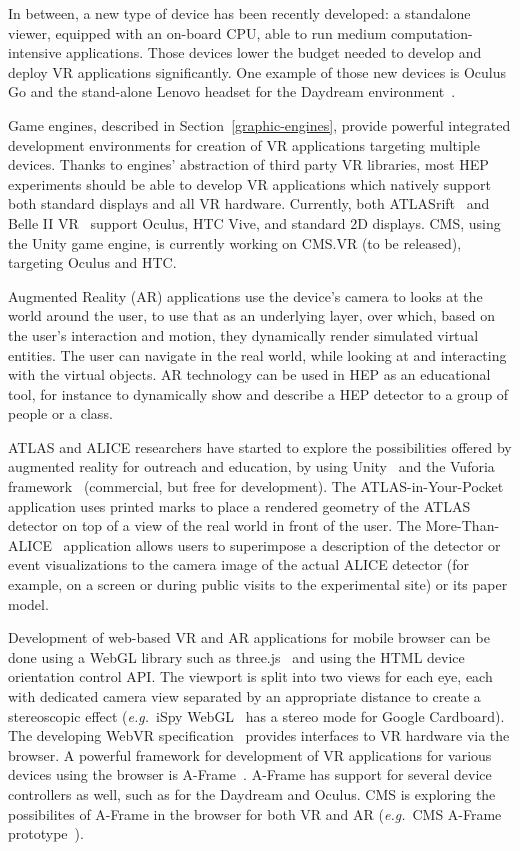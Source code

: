 \documentclass[12pt,a4paper]{article}
\begin{document}
In between, a new type of device has been recently developed: a standalone viewer, equipped with an on-board CPU, able to run
medium computation-intensive applications. Those devices lower the budget needed to develop and deploy VR applications significantly.
One example of those new devices is Oculus Go\cite{OculusGo} and the stand-alone Lenovo headset for the
Daydream environment~\cite{LenovoMirageSolo}.

Game engines, described in Section~\ref{graphic-engines},  provide powerful integrated development environments for
creation of VR applications targeting multiple devices. Thanks to engines' abstraction of third party VR libraries,
most HEP experiments should be able to develop VR applications which natively support both standard displays and all VR hardware.
Currently, both ATLASrift~\cite{ATLASRift} and Belle II VR~\cite{BelleIIVR} support Oculus, HTC Vive,
and standard 2D displays. CMS, using the Unity game engine, is currently working on CMS.VR (to be released), targeting Oculus and HTC.

Augmented Reality (AR) applications use the device's camera to looks at the world around the user, to use that as an underlying layer,
over which, based on the user's interaction and motion, they dynamically render simulated virtual entities. The user can navigate in the real world, while
looking at and interacting with the virtual objects. AR technology can be used in HEP as an educational tool, for instance to
dynamically show and describe a HEP detector to a group of people or a class.

ATLAS and ALICE researchers have started to explore the possibilities offered by augmented reality for outreach and education,
by using Unity~\cite{Unity3D} and the Vuforia framework~\cite{VuforiaAR} (commercial, but free for development). The ATLAS-in-Your-Pocket~\cite{AtlasPocket} application
uses printed marks to place a rendered geometry of the ATLAS detector on top of a view of the real world in front of the user.
The More-Than-ALICE~\cite{MoreThanALICE} application allows users to superimpose a description of the detector or event visualizations to the camera image of the actual
ALICE detector (for example, on a screen or during public visits to the experimental site) or its paper model.

Development of web-based VR and AR applications for mobile browser can be done using a WebGL library such as three.js~\cite{ThreeJS} and using the
HTML device orientation control API. The viewport is split into two views for each eye, each with dedicated camera view separated
by an appropriate distance to create a stereoscopic effect ({\it e.g.}\ iSpy WebGL~\cite{CMSISpyWebGL} has a stereo mode for Google Cardboard). 
The developing WebVR specification~\cite{WebVR} provides interfaces to VR hardware via the browser. A powerful framework for
development of VR applications for various devices using the browser is A-Frame~\cite{AFrame}. A-Frame has support for several device controllers as well,
such as for the Daydream and Oculus. CMS is exploring the possibilites of A-Frame in the
browser for both VR and AR ({\it e.g.}\ CMS A-Frame prototype~\cite{CMSAFrame}).
\end{document}
